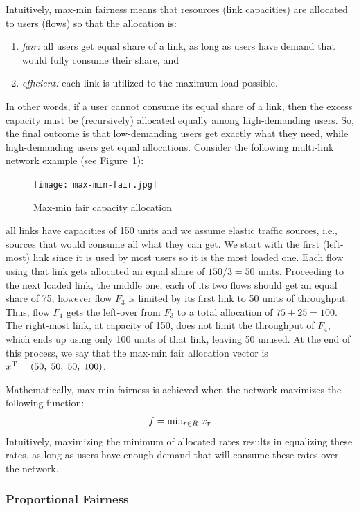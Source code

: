 \documentclass{article}
\begin{document}
Intuitively, max-min fairness means that  resources (link capacities) are allocated to users (flows) so that
the allocation is: 
\begin{enumerate}
\item {\em fair:} all users get equal share of a link, as long as users have demand that would fully consume their share, and
\item {\em efficient:} each link is utilized to the maximum load possible.
\end{enumerate}
In other words, if a user cannot consume its equal share of a link, then the excess capacity must be (recursively) allocated equally among high-demanding users. So, the final outcome is that low-demanding users get exactly what they need, while high-demanding users get equal allocations. Consider the following multi-link network example 
(see Figure~\ref{fig:max-min-alloc}):
\begin{figure}[htbp] %
   \centering
   \texttt{[image: max-min-fair.jpg]} 
   \caption{Max-min fair capacity allocation}
   \label{fig:max-min-alloc}
\end{figure}
all links have capacities of 150 units and we assume elastic traffic sources, i.e., sources that would consume all what they can get. We start with the first (left-most) link since it is used by most users so it is the most loaded one. Each flow using that link gets allocated an equal share of $150/3=50$ units. Proceeding to the next loaded link, the middle one, each of its two flows should get an equal share of 75, however flow $F_3$ is limited by its first link to 50 units of throughput. Thus, flow $F_4$ gets the left-over from $F_3$ to a total allocation of $75+25=100$. The right-most link, at capacity of 150, does not limit the throughput  of $F_4$, which ends up using only 100 units of that link, leaving 50 unused. At the end of this process, we say that the max-min fair allocation  vector is $x^{\rm T} =(50,\; 50,\; 50,\; 100)$.

Mathematically, max-min fairness is achieved when the network maximizes the following function:
\begin{eqnarray*}
f = {\rm min}_{r \in R} \ x_r
\end{eqnarray*}
Intuitively, maximizing the minimum of allocated rates results in equalizing these rates, as long as users have enough demand that will consume these rates over the network.

\subsubsection{Proportional Fairness}
\end{document}
